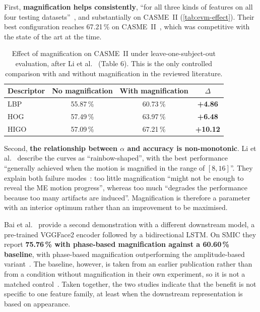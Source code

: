 First, \textbf{magnification helps consistently}, ``for all three kinds of features on all four testing datasets''~\cite{liX2018}, and substantially on CASME~II (\autoref{tab:evm-effect}). Their best configuration reaches 67.21\,\% on CASME~II~\cite{liX2018}, which was competitive with the state of the art at the time.

\begin{table}[htbp]
	\centering
	\small
	\begin{tabular}{l c c c}
		\hline
		\textbf{Descriptor} & \textbf{No magnification} & \textbf{With magnification} & \textbf{$\Delta$} \\
		\hline
		LBP  & 55.87\,\% & 60.73\,\% & \textbf{+4.86} \\
		HOG  & 57.49\,\% & 63.97\,\% & \textbf{+6.48} \\
		HIGO & 57.09\,\% & 67.21\,\% & \textbf{+10.12} \\
		\hline
	\end{tabular}
	\caption[Effect of Eulerian motion magnification on CASME II]{Effect of magnification on CASME~II under leave-one-subject-out evaluation, after Li et al.~\cite{liX2018} (Table 6). This is the only controlled comparison with and without magnification in the reviewed literature.}
	\label{tab:evm-effect}
\end{table}

Second, \textbf{the relationship between $\alpha$ and accuracy is non-monotonic}. Li et al.~\cite{liX2018} describe the curves as ``rainbow-shaped'', with the best performance ``generally achieved when the motion is magnified in the range of $[8, 16]$''. They explain both failure modes~\cite{liX2018}: too little magnification ``might not be enough to reveal the ME motion progress'', whereas too much ``degrades the performance because too many artifacts are induced''. Magnification is therefore a parameter with an interior optimum rather than an improvement to be maximised.

Bai et al.~\cite{bai2021} provide a second demonstration with a different downstream model, a pre-trained VGGFace2 encoder followed by a bidirectional LSTM. On SMIC they report \textbf{75.76\,\% with phase-based magnification against a 60.60\,\% baseline}, with phase-based magnification outperforming the amplitude-based variant~\cite{bai2021}. The baseline, however, is taken from an earlier publication rather than from a condition without magnification in their own experiment, so it is not a matched control~\cite{bai2021}. Taken together, the two studies indicate that the benefit is not specific to one feature family, at least when the downstream representation is based on appearance.

